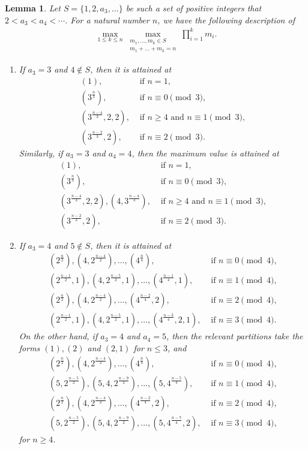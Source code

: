 \documentclass[12pt]{amsart}
\newtheorem{lemma}[theorem]{Lemma}
\theoremstyle{definition}
\theoremstyle{remark}
\numberwithin{theorem}{section} \numberwithin{equation}{section}
\begin{document}
\begin{lemma}\label{Lemma: a_2=2}
Let $S=\{1,2,a_3,\ldots\}$ be such a set of positive integers that $2<a_3<a_4<\cdots$. For a natural number $n$, we have the following description of
\begin{align*}
\max_{1\leq k\leq n}\max_{\substack{ m_1,\ldots,m_k\in S \\ m_{1}+\ldots +m_{k}=n}}\prod_{i=1}^km_i.
\end{align*}
\begin{enumerate}

\item If $a_3=3$ and $4\not\in S$, then it is attained at
\begin{align*}
(1), &\text{ if } n=1,\\
(3^\frac{n}{3}), &\text{ if } n\equiv0\pmod{3},\\
 (3^\frac{n-4}{3},2,2), &\text{ if } n\geq4 \text{ and } n\equiv1\pmod{3},\\
 (3^\frac{n-2}{3},2), &\text{ if }n\equiv2\pmod{3}.
\end{align*}
Similarly, if $a_3=3$ and $a_4=4$, then the maximum value is attained at 
\begin{align*}
(1), &\text{ if } n=1,\\
(3^\frac{n}{3}), &\text{ if } n\equiv0\pmod{3},\\
 (3^\frac{n-4}{3},2,2),\left( 4,3^\frac{n-4}{3}\right)
, &\text{ if } n\geq4 \text{ and } n\equiv1\pmod{3},\\
 (3^\frac{n-2}{3},2), &\text{ if }n\equiv2\pmod{3}.
\end{align*}


\item If $a_3=4$ and $5\not\in S$, then it is attained at
\begin{align*}
(2^{\frac{n}{2}}),(4,2^{\frac{n-4}{2}}),\ldots,(4^{\frac{n}{4}}), &\text{ if } n\equiv0\pmod{4},\\
(2^{\frac{n-1}{2}},1),(4,2^{\frac{n-5}{2}},1),\ldots,(4^{\frac{n-1}{4}},1), &\text{ if } n\equiv1\pmod{4},\\
(2^{\frac{n}{2}}),(4,2^{\frac{n-4}{2}}),\ldots,(4^{\frac{n-2}{4}},2), &\text{ if } n\equiv2\pmod{4},\\
(2^{\frac{n-1}{2}},1),(4,2^{\frac{n-5}{2}},1),\ldots,(4^{\frac{n-3}{4}},2,1), &\text{ if } n\equiv3\pmod{4}.
\end{align*} 
On the other hand, if $a_3=4$ and $a_4=5$, then the relevant partitions take the forms $(1), (2)$ and
$(2,1)$ for $n\leq3$, and
\begin{align*}
(2^{\frac{n}{2}}),(4,2^{\frac{n-4}{2}}),\ldots,(4^{\frac{n}{4}}), &\text{ if } n\equiv0\pmod{4},\\
(5,2^{\frac{n-5}{2}}),(5,4,2^{\frac{n-9}{2}}),\ldots,(5,4^{\frac{n-5}{4}}), &\text{ if } n\equiv1\pmod{4},\\
(2^{\frac{n}{2}}),(4,2^{\frac{n-4}{2}}),\ldots,(4^{\frac{n-2}{4}},2), &\text{ if } n\equiv2\pmod{4},\\
(5,2^{\frac{n-5}{2}}),(5,4,2^{\frac{n-9}{2}}),\ldots,(5,4^{\frac{n-7}{4}},2), &\text{ if } n\equiv3\pmod{4},
\end{align*}
for $n\geq4$.


\end{enumerate}
\end{lemma}
\end{document}
